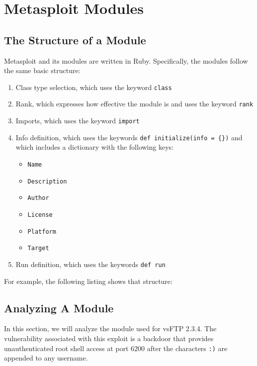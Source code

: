 \chapter{Metasploit Modules}

\section{The Structure of a Module}

Metasploit and its modules are written in Ruby. Specifically, the modules follow the same basic structure:

\begin{enumerate}
    \item Class type selection, which uses the keyword \texttt{class}
    \item Rank, which expresses how effective the module is and uses the keyword \texttt{rank} 
    \item Imports, which uses the keyword \texttt{import}
    \item Info definition, which uses the keywords \texttt{def initialize(info = \{\})} and which includes a dictionary with the following keys: 
    \begin{itemize}
        \item \texttt{Name}
        \item \texttt{Description}
        \item \texttt{Author}
        \item \texttt{License}
        \item \texttt{Platform}
        \item \texttt{Target}
    \end{itemize}
    \item Run definition, which uses the keywords \texttt{def run}
\end{enumerate}

For example, the following listing shows that structure: 

\begin{listingbox}
    
\end{listingbox}

\section{Analyzing A Module}

In this section, we will analyze the module used for vsFTP 2.3.4. The vulnerability associated with this exploit is a backdoor that provides unauthenticated root shell access at port 6200 after the characters \texttt{:)} are appended to any username.

